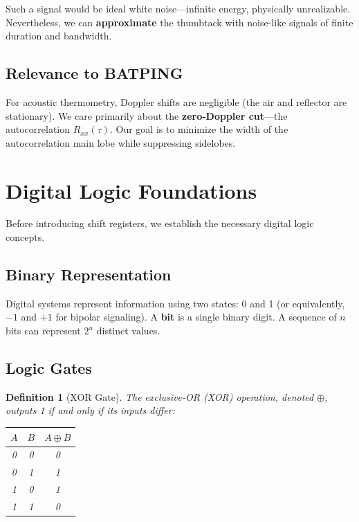 \documentclass[11pt]{article}
\newtheorem{definition}{Definition}
\begin{document}
Such a signal would be ideal white noise---infinite energy, physically unrealizable. Nevertheless, we can \textbf{approximate} the thumbtack with noise-like signals of finite duration and bandwidth.

\subsection{Relevance to BATPING}

For acoustic thermometry, Doppler shifts are negligible (the air and reflector are stationary). We care primarily about the \textbf{zero-Doppler cut}---the autocorrelation $R_{xx}(\tau)$. Our goal is to minimize the width of the autocorrelation main lobe while suppressing sidelobes.

\section{Digital Logic Foundations}

Before introducing shift registers, we establish the necessary digital logic concepts.

\subsection{Binary Representation}

Digital systems represent information using two states: 0 and 1 (or equivalently, $-1$ and $+1$ for bipolar signaling). A \textbf{bit} is a single binary digit. A sequence of $n$ bits can represent $2^n$ distinct values.

\subsection{Logic Gates}

\begin{definition}[XOR Gate]
The exclusive-OR (XOR) operation, denoted $\oplus$, outputs 1 if and only if its inputs differ:
\begin{center}
\begin{tabular}{cc|c}
$A$ & $B$ & $A \oplus B$ \\
\midrule
0 & 0 & 0 \\
0 & 1 & 1 \\
1 & 0 & 1 \\
1 & 1 & 0 \\
\end{tabular}
\end{center}
\end{definition}
\end{document}
